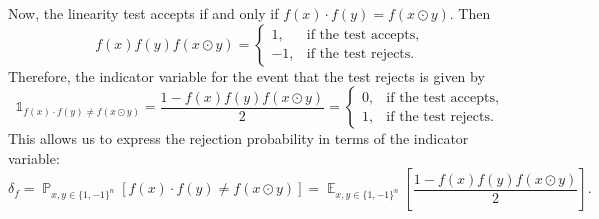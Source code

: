 \documentclass[letterpaper, reqno,11pt]{article}
\newcommand{\PP}{\mathop{{}\mathbb{P}}}
\newcommand{\EE}{\mathop{{}\mathbb{E}}}
\begin{document}
Now, the linearity test accepts if and only if $f(x) \cdot f(y) = f(x \odot y)$. Then
$$ f(x) f(y) f(x \odot y) = \left\{
  \begin{array}{ll}
    1, & \text{if the test accepts}, \\
    -1, & \text{if the test rejects}.
  \end{array}
\right. $$
Therefore, the indicator variable for the event that the test rejects is given by
$$ \mathds 1_{f(x) \cdot f(y) \neq f(x \odot y)} = \frac{1 - f(x) f(y) f(x \odot y)}{2} = \left\{
  \begin{array}{ll}
    0, & \text{if the test accepts}, \\
    1, & \text{if the test rejects}.
  \end{array}
\right. $$
This allows us to express the rejection probability in terms of the indicator variable:
$$ \delta_f = \PP_{x, y \in \{ 1, -1 \}^n}[f(x) \cdot f(y) \neq f(x \odot y)] = \EE_{x, y \in \{ 1, -1 \}^n}\left[\frac{1 - f(x) f(y) f(x \odot y)}{2}\right]. $$
\end{document}

